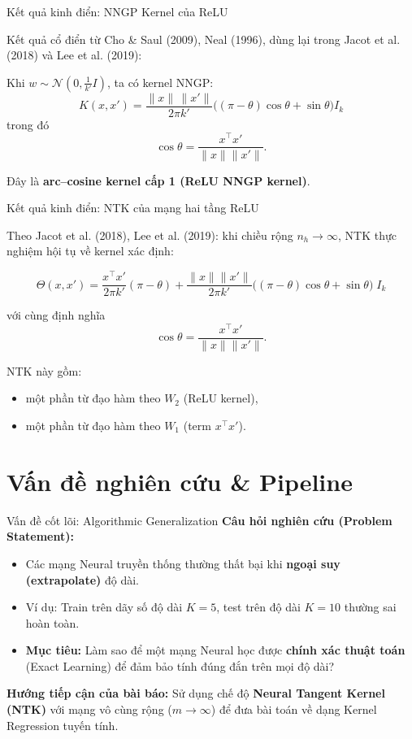 \documentclass[12pt]{beamer}
\begin{document}
\begin{frame}{Kết quả kinh điển: NNGP Kernel của ReLU}

Kết quả cổ điển từ Cho \& Saul (2009), Neal (1996), dùng lại trong
Jacot et al. (2018) và Lee et al. (2019):

\vspace{0.2cm}
Khi $w \sim \mathcal N(0,\tfrac{1}{k'}I)$, ta có kernel NNGP:
\[
K(x,x')
=
\frac{\|x\|\,\|x'\|}{2\pi k'}
\Big(
(\pi - \theta)\cos\theta + \sin\theta
\Big)
I_k
\]
trong đó
\[
\cos\theta
=
\frac{x^\top x'}{\|x\|\|x'\|}.
\]

\vspace{0.2cm}
Đây là \textbf{arc--cosine kernel cấp 1 (ReLU NNGP kernel)}.
\end{frame}

\begin{frame}{Kết quả kinh điển: NTK của mạng hai tầng ReLU}

Theo Jacot et al. (2018), Lee et al. (2019):
khi chiều rộng $n_h \to \infty$, NTK thực nghiệm hội tụ về
kernel xác định:

\[
\Theta(x,x')
=
\frac{x^\top x'}{2\pi k'}(\pi - \theta)
+
\frac{\|x\|\|x'\|}{2\pi k'}
\Big(
(\pi - \theta)\cos\theta + \sin\theta
\Big)
\; I_k
\]

với cùng định nghĩa
\[
\cos\theta = \frac{x^\top x'}{\|x\|\|x'\|}.
\]

\vspace{0.2cm}
NTK này gồm:
\begin{itemize}
    \item một phần từ đạo hàm theo $W_2$ (ReLU kernel),
    \item một phần từ đạo hàm theo $W_1$ (term $x^\top x'$).
\end{itemize}

\end{frame}

\section{Vấn đề nghiên cứu & Pipeline}

\begin{frame}{Vấn đề cốt lõi: Algorithmic Generalization}
  \textbf{Câu hỏi nghiên cứu (Problem Statement):}
  \begin{itemize}
    \item Các mạng Neural truyền thống thường thất bại khi \textbf{ngoại suy (extrapolate)} độ dài. 
    \item Ví dụ: Train trên dãy số độ dài $K=5$, test trên độ dài $K=10$ thường sai hoàn toàn.
    \item \textbf{Mục tiêu:} Làm sao để một mạng Neural học được \textbf{chính xác thuật toán} (Exact Learning) để đảm bảo tính đúng đắn trên mọi độ dài?
  \end{itemize}

  \vspace{0.3cm}
  \textbf{Hướng tiếp cận của bài báo:}
  Sử dụng chế độ \textbf{Neural Tangent Kernel (NTK)} với mạng vô cùng rộng ($m \to \infty$) để đưa bài toán về dạng Kernel Regression tuyến tính.
\end{frame}
\end{document}
